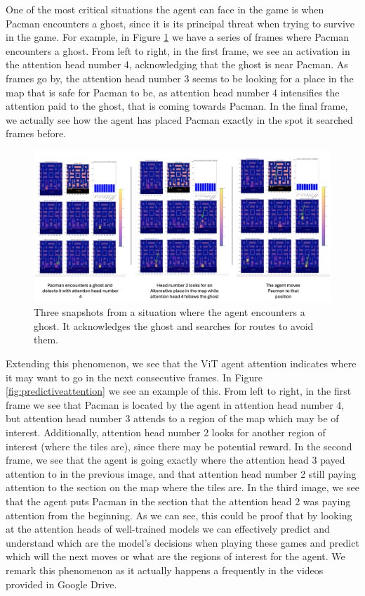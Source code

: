 One of the most critical situations the agent can face in the game is when Pacman encounters a ghost, since it is its principal threat when trying to survive in the game. For example, in Figure \ref{fig:avoidingghosts} we have a series of frames where Pacman encounters a ghost. From left to right, in the first frame, we see an activation in the attention head number 4, acknowledging that the ghost is near Pacman. As frames go by, the attention head number 3 seems to be looking for a place in the map that is safe for Pacman to be, as attention head number 4 intensifies the attention paid to the ghost, that is coming towards Pacman. In the final frame, we actually see how the agent has placed Pacman exactly in the spot it searched frames before.

\begin{figure}[!h]
	\centering
	\includegraphics[width=\linewidth]{figures/avoiding_ghost}
	\caption{Three snapshots from a situation where the agent encounters a ghost. It acknowledges the ghost and searches for routes to avoid them.}
	\label{fig:avoidingghosts}
\end{figure}


Extending this phenomenon, we see that the ViT agent attention indicates where it may want to go in the next consecutive frames. In Figure \ref{fig:predictiveattention} we see an example of this. From left to right, in the first frame we see that Pacman is located by the agent in attention head number 4, but attention head number 3 attends to a region of the map which may be of interest. Additionally, attention head number 2 looks for another region of interest (where the tiles are), since there may be potential reward. In the second frame, we see that the agent is going exactly where the attention head 3 payed attention to in the previous image, and that attention head number 2 still paying attention to the section on the map where the tiles are. In the third image, we see that the agent puts Pacman in the section that the attention head 2 was paying attention from the beginning. As we can see, this could be proof that by looking at the attention heads of well-trained models we can effectively predict and understand which are the model's decisions when playing these games and predict which will the next moves or what are the regions of interest for the agent. We remark this phenomenon as it actually happens a frequently in the videos provided in Google Drive.

